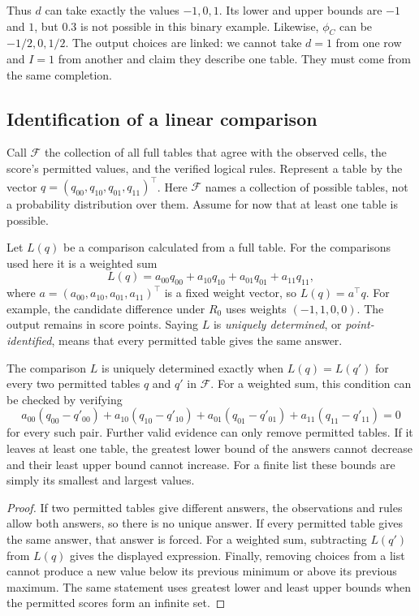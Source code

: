 Thus $d$ can take exactly the values $-1,0,1$. Its lower and upper bounds are
$-1$ and $1$, but $0.3$ is not possible in this binary example. Likewise,
$\phi_C$ can be $-1/2,0,1/2$. The output choices are linked: we cannot take
$d=1$ from one row and $I=1$ from another and claim they describe one table.
They must come from the same completion.

\subsection{Identification of a linear comparison}
\label{subsec:linear-identification}

Call $\mathcal F$ the collection of all full tables that agree with the
observed cells, the score's permitted values, and the verified logical rules.
Represent a table by the vector $q=(q_{00},q_{10},q_{01},q_{11})^{\top}$. Here $\mathcal F$ names a collection of
possible tables, not a probability distribution over them. Assume for now
that at least one table is possible.

Let $L(q)$ be a comparison calculated from a full table. For the comparisons
used here it is a weighted sum
\[
L(q)=a_{00}q_{00}+a_{10}q_{10}+a_{01}q_{01}+a_{11}q_{11},
\]
where $a=(a_{00},a_{10},a_{01},a_{11})^{\top}$ is a fixed weight vector, so $L(q)=a^{\top}q$. For example, the
candidate difference under $R_0$ uses weights $(-1,1,0,0)$. The output remains
in score points. Saying $L$ is \emph{uniquely determined}, or
\emph{point-identified}, means that every permitted table gives the same
answer.

\begin{proposition}
\label{prop:completion}
The comparison $L$ is uniquely determined exactly when $L(q)=L(q')$ for
every two permitted tables $q$ and $q'$ in $\mathcal F$. For a weighted sum,
this condition can be checked by verifying
\[
a_{00}(q_{00}-q'_{00})+a_{10}(q_{10}-q'_{10})
+a_{01}(q_{01}-q'_{01})+a_{11}(q_{11}-q'_{11})=0
\]
for every such pair. Further valid evidence can only remove permitted tables.
If it leaves at least one table, the greatest lower bound of the answers
cannot decrease and their least upper bound cannot increase. For a finite
list these bounds are simply its smallest and largest values.
\end{proposition}

\begin{proof}
If two permitted tables give different answers, the observations and rules
allow both answers, so there is no unique answer. If every permitted table
gives the same answer, that answer is forced. For a weighted sum, subtracting
$L(q')$ from $L(q)$ gives the displayed expression. Finally, removing choices
from a list cannot produce a new value below its previous minimum or above
its previous maximum. The same statement uses greatest lower and least upper
bounds when the permitted scores form an infinite set.
\end{proof}

